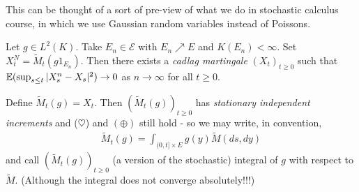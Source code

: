 \documentclass[12pt,a4paper]{report}
\begin{document}
This can be thought of a sort of pre-view of what we do in stochastic calculus course, in which we use Gaussian random variables instead of Poissons.
\s

 Let $g\in L^2(K)$. Take $E_n \in \mathscr{E}$ with $E_n \nearrow E$ and $K(E_n) < \infty$. Set $X_t^N = \tilde{M}_t(g1_{E_n})$. Then there exists a \emph{cadlag martingale} $(X_t)_{t\geq 0}$ such that $\mathbb{E}(\sup_{s\leq t} |X_s^n - X_s|^2) \rightarrow 0$ as $n\rightarrow \infty$ for all $t\geq 0$. 

\quad Define $\tilde{M}_t(g) = X_t$. Then $(\tilde{M}_t(g))_{t\geq 0}$ has \emph{stationary independent increments} and ($\heartsuit$) and $(\oplus)$ still hold - so we may write, in convention,
\begin{align*}
\tilde{M}_t(g) = \int_{(0,t] \times E} g(y) \tilde{M}(ds,dy)
\end{align*}
and call $(\tilde{M}_t(g))_{t\geq 0}$ (a version of the stochastic) integral of $g$ with respect to $\tilde{M}$. (Although the integral does not converge absolutely!!!)
\end{document}
